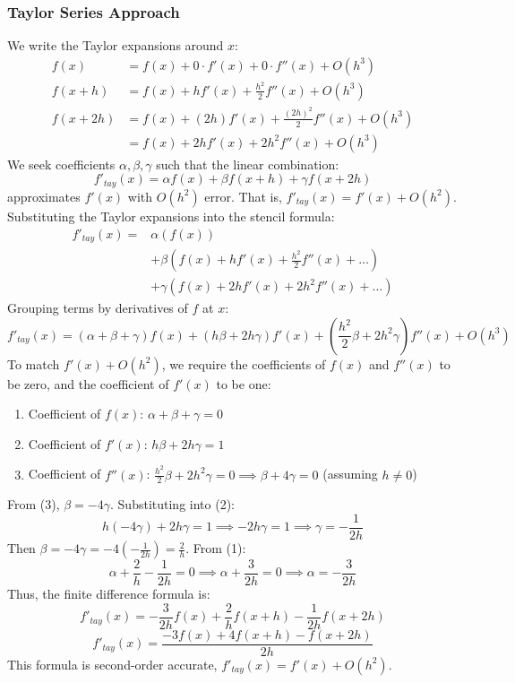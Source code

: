\documentclass{article}
\begin{document}
\subsubsection{Taylor Series Approach}
We write the Taylor expansions around $x$:
\begin{align*} f(x) &= f(x) + 0 \cdot f'(x) + 0 \cdot f''(x) + O(h^3) \\ f(x+h) &= f(x) + h f'(x) + \frac{h^2}{2} f''(x) + O(h^3) \\ f(x+2h) &= f(x) + (2h) f'(x) + \frac{(2h)^2}{2} f''(x) + O(h^3) \\ &= f(x) + 2h f'(x) + 2h^2 f''(x) + O(h^3) \end{align*}
We seek coefficients $\alpha, \beta, \gamma$ such that the linear combination:
\[
f'_{tay}(x) = \alpha f(x) + \beta f(x+h) + \gamma f(x+2h)
\]
approximates $f'(x)$ with $O(h^2)$ error. That is, $f'_{tay}(x) = f'(x) + O(h^2)$.
Substituting the Taylor expansions into the stencil formula:
\begin{align*} f'_{tay}(x) = &\alpha (f(x)) \\ &+ \beta (f(x) + h f'(x) + \frac{h^2}{2} f''(x) + \dots) \\ &+ \gamma (f(x) + 2h f'(x) + 2h^2 f''(x) + \dots) \end{align*}
Grouping terms by derivatives of $f$ at $x$:
\[
f'_{tay}(x) = (\alpha + \beta + \gamma) f(x) + (h\beta + 2h\gamma) f'(x) + (\frac{h^2}{2}\beta + 2h^2\gamma) f''(x) + O(h^3)
\]
To match $f'(x) + O(h^2)$, we require the coefficients of $f(x)$ and $f''(x)$ to be zero, and the coefficient of $f'(x)$ to be one:
\begin{enumerate}
    \item Coefficient of $f(x)$: $\alpha + \beta + \gamma = 0$
    \item Coefficient of $f'(x)$: $h\beta + 2h\gamma = 1$
    \item Coefficient of $f''(x)$: $\frac{h^2}{2}\beta + 2h^2\gamma = 0 \implies \beta + 4\gamma = 0$ (assuming $h \neq 0$)
\end{enumerate}
From (3), $\beta = -4\gamma$. Substituting into (2):
\[
h(-4\gamma) + 2h\gamma = 1 \implies -2h\gamma = 1 \implies \gamma = -\frac{1}{2h}
\]
Then $\beta = -4\gamma = -4(-\frac{1}{2h}) = \frac{2}{h}$.
From (1):
\[
\alpha + \frac{2}{h} - \frac{1}{2h} = 0 \implies \alpha + \frac{3}{2h} = 0 \implies \alpha = -\frac{3}{2h}
\]
Thus, the finite difference formula is:
\[
f'_{tay}(x) = -\frac{3}{2h} f(x) + \frac{2}{h} f(x+h) - \frac{1}{2h} f(x+2h)
\]
\[
f'_{tay}(x) = \frac{-3f(x) + 4f(x+h) - f(x+2h)}{2h}
\]
This formula is second-order accurate, $f'_{tay}(x) = f'(x) + O(h^2)$.
\end{document}
